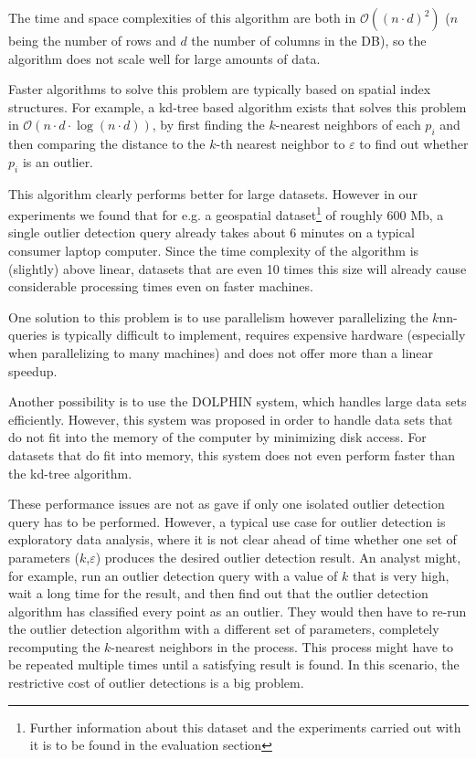 \documentclass[runningheads]{llncs}
\begin{document}
The time and space complexities of this algorithm are both in $\mathcal{O}((n\cdot d)^2)$ ($n$ being the number of rows and $d$ the number of columns in the DB), so the algorithm does not scale well for large amounts of data.

Faster algorithms to solve this problem are typically based on spatial index structures. For example, a kd-tree based algorithm exists that solves this problem in $\mathcal{O}(n\cdot d \cdot\log(n\cdot d))$, by first finding the $k$-nearest neighbors of each $p_i$ and then comparing the distance to the $k$-th nearest neighbor to $\varepsilon$ to find out whether $p_i$ is an outlier. 

This algorithm clearly performs better for large datasets. However in our experiments we found that for e.g. a geospatial dataset\footnote{Further information about this dataset and the experiments carried out with it is to be found in the evaluation section} of roughly 600 Mb, a single outlier detection query already takes about 6 minutes on a typical consumer laptop computer. Since the time complexity of the algorithm is (slightly) above linear, datasets that are even 10 times this size will already cause considerable processing times even on faster machines.

One solution to this problem is to use parallelism \cite{parallel_knn}
however parallelizing the $k$nn-queries is typically difficult to implement, requires expensive hardware (especially when parallelizing to many machines) and does not offer more than a linear speedup.

Another possibility is to use the DOLPHIN system\cite{dolphin}, which handles large data sets efficiently. However, this system was proposed in order to handle data sets that do not fit into the memory of the computer by minimizing disk access. For datasets that do fit into memory, this system does not even perform faster than the kd-tree algorithm.

These performance issues are not as gave if only one isolated outlier detection query has to be performed. However, a typical use case for outlier detection is exploratory data analysis, where it is not clear ahead of time whether one set of parameters ($k$,$\varepsilon$) produces the desired outlier detection result. An analyst might, for example, run an outlier detection query with a value of $k$ that is very high, wait a long time for the result, and then find out that the outlier detection algorithm has classified every point as an outlier. They would then have to re-run the outlier detection algorithm with a different set of parameters, completely recomputing the $k$-nearest neighbors in the process. This process might have to be repeated multiple times until a satisfying result is found. In this scenario, the restrictive cost of outlier detections is a big problem.
\end{document}
